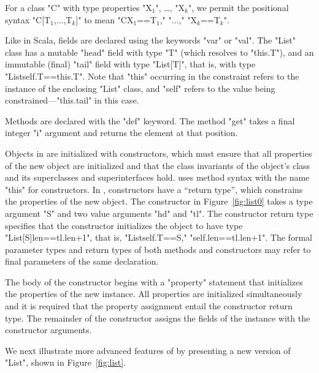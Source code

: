 For a class
\xcd"C"
with type properties
\xcdmath"X$_1$",
\dots,
\xcdmath"X$_k$",
we permit the positional syntax \xcdmath"C[T$_1$,$\dots$,T$_k$]"
to mean \xcdmath"C{X$_1$==T$_1$," \xcdmath"$\dots$," \xcdmath"X$_k$==T$_k$}".

Like in Scala, fields are declared using the keywords \xcd"var"
or \xcd"val".  The \xcd"List" class has a mutable \xcd"head"
field with type \xcd"T" (which resolves to \xcd"this.T"), and an
immutable (final) \xcd"tail" field with type \xcd"List[T]", that
is, with type \xcd"List{self.T==this.T}".  Note that \xcd"this" occurring
in the constraint refers to the instance of the enclosing
\xcd"List" class,
and \xcd"self" refers to the value being
constrained---\xcd"this.tail" in this case.

Methods are declared with the \xcd"def" keyword.
The method \xcd"get" takes a final integer \xcd"i" argument
and returns the element at that position.

Objects in \Xten{} are initialized with constructors, which
must ensure that all properties of the new object
are initialized and that the class invariants of the object's
class and its superclasses and superinterfaces hold.
\Xten{} uses method syntax with the name
\xcd"this" for constructors.
In \Xten{}, constructors have a ``return type'', which constrains
the properties of the new object.  The constructor in
Figure~\ref{fig:list0} takes a type argument \xcd"S"
and two value arguments \xcd"hd" and \xcd"tl".  The constructor
return type specifies that the constructor initializes the
object to have type \xcd"List[S]{len==tl.len+1}", that is,
\xcd"List{self.T==S," \xcd"self.len==tl.len+1}".
The formal parameter types and return types of both methods and
constructors may refer to final parameters of the same
declaration.

The body of the constructor
begins with a \xcd"property" statement that initializes the
properties of the new instance.  All properties are initialized
simultaneously and it is required that the property assignment
entail the constructor return type.
The remainder of the constructor assigns the fields of the
instance with the constructor arguments.

We next illustrate more advanced features of \Xten by
presenting a new version of \xcd"List", shown
in Figure~\ref{fig:list}.


